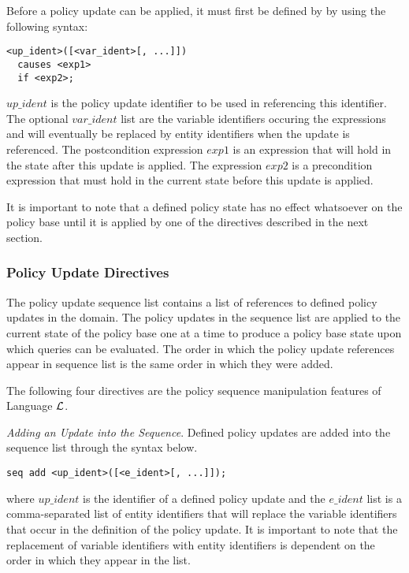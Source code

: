 \documentclass[10pt, twocolumn]{article}
\begin{document}
        Before a policy update can be applied, it must first be defined by
        by using the following syntax:

\begin{verbatim}
<up_ident>([<var_ident>[, ...]])
  causes <exp1>
  if <exp2>;
\end{verbatim}

        $up\_ident$ is the policy update identifier to be used in referencing
        this identifier. The optional $var\_ident$ list are the variable
        identifiers occuring the expressions and will eventually be replaced
        by entity identifiers when the update is referenced. The postcondition
        expression $exp1$ is an expression that will hold in the state after
        this update is applied. The expression $exp2$ is a precondition
        expression that must hold in the current state before this update is
        applied.

        It is important to note that a defined policy state has no effect
        whatsoever on the policy base until it is applied by one of the
        directives described in the next section.

      \subsubsection{Policy Update Directives}

        The policy update sequence list contains a list of references to
        defined policy updates in the domain. The policy updates in the
        sequence list are applied to the current state of the policy base one
        at a time to produce a policy base state upon which queries can be
        evaluated. The order in which the policy update references appear in
        sequence list is the same order in which they were added.

        The following four directives are the policy sequence manipulation
        features of Language $\cal{L}$.

        \emph{Adding an Update into the Sequence}. Defined policy updates are
        added into the sequence list through the syntax below.

        \begin{verbatim}seq add <up_ident>([<e_ident>[, ...]]);\end{verbatim}

        where $up\_ident$ is the identifier of a defined policy update and 
        the $e\_ident$ list is a comma-separated list of entity identifiers
        that will replace the variable identifiers that occur in the
        definition of the policy update. It is important to note that the
        replacement of variable identifiers with entity identifiers is
        dependent on the order in which they appear in the list.
\end{document}
